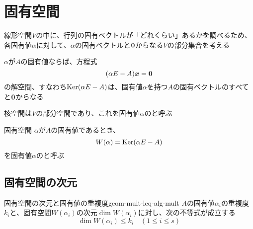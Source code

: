 \documentclass[../../../topic_linear-algebra]{subfiles}
\begin{document}
\sectionline
\section{固有空間}

線形空間$V$の中に、行列の固有ベクトルが「どれくらい」あるかを調べるため、各固有値$\alpha$に対して、$\alpha$の固有ベクトルと$\vb*{0}$からなる$V$の部分集合を考える

\br

$\alpha$が$A$の固有値ならば、方程式
\begin{equation*}
  (\alpha E - A)\vb*{x} = \vb*{0}
\end{equation*}
の解空間、すなわち$\operatorname{Ker}(\alpha E - A)$は、固有値$\alpha$を持つ$A$の固有ベクトルのすべてと$\vb*{0}$からなる

\br

核空間は$V$の部分空間であり、これを固有値$\alpha$のと呼ぶ

\begin{definition}{固有空間}
  $\alpha$が$A$の固有値であるとき、
  \begin{equation*}
    W(\alpha) = \operatorname{Ker}(\alpha E - A)
  \end{equation*}
  を固有値$\alpha$のと呼ぶ
\end{definition}

\subsection{固有空間の次元}

\begin{theorem}{固有空間の次元と固有値の重複度}{geom-mult-leq-alg-mult}
  $A$の固有値$\alpha_i$の重複度$k_i$と、固有空間$W(\alpha_i)$の次元$\dim W(\alpha_i)$に対し、次の不等式が成立する
  \begin{equation*}
    \dim W(\alpha_i) \leq k_i \quad (1 \leq i \leq s)
  \end{equation*}
\end{theorem}
\end{document}
